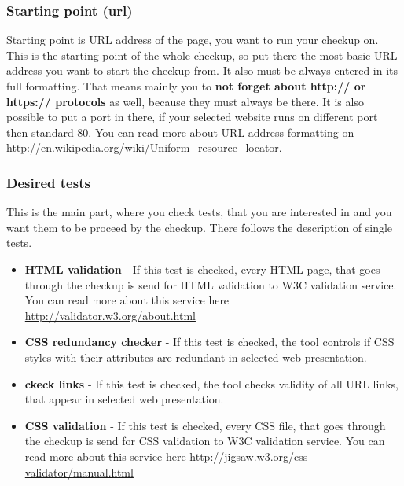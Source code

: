 \documentclass[12pt,a4paper]{article}
\begin{document}
\subsubsection{Starting point (url)} \label{address}
Starting point is URL address of the page, you want to run your checkup on. This is the starting point of the whole checkup, so put there the most basic URL address you want to start the checkup from. It also must be always entered in its full formatting. That means mainly you to \textbf{not forget about http://  or https:// protocols} as well, because they must always be there. It is also possible to put a port in there, if your selected website runs on different port then standard 80. You can read more about URL address formatting on \url{http://en.wikipedia.org/wiki/Uniform_resource_locator}.

\subsubsection{Desired tests}
This is the main part, where you check tests, that you are interested in and you want them to be proceed by the checkup.
There follows the description of single tests.
\begin{itemize}
	\item \textbf{HTML validation} - If this test is checked, every HTML page, that goes through the checkup is send for HTML validation to W3C validation service. You can read more about this service here \url{http://validator.w3.org/about.html}
	\item \textbf{CSS redundancy checker} - If this test is checked, the tool controls if CSS styles with their attributes are redundant in selected web presentation.
	\item \textbf{ckeck links} - If this test is checked, the tool checks validity of all URL links, that appear in selected web presentation.
	\item \textbf{CSS validation} - If this test is checked, every CSS file, that goes through the checkup is send for CSS validation to W3C validation service. You can read more about this service here \url{http://jigsaw.w3.org/css-validator/manual.html}
\end{itemize}
\end{document}
